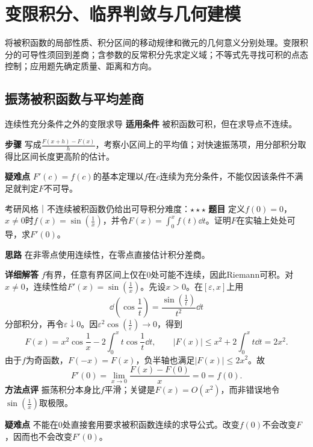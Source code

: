 \section{变限积分、临界判敛与几何建模}\label{ci:integrals}
\begin{examtip}
将被积函数的局部性质、积分区间的移动规律和微元的几何意义分别处理。变限积分的可导性须回到差商；含参数的反常积分先求定义域；不等式先寻找可积的点态控制；应用题先确定质量、距离和方向。
\end{examtip}

\subsection{振荡被积函数与平均差商}\label{ci:oscillatory}
\begin{method}{连续性充分条件之外的变限求导}
\textbf{适用条件} 被积函数可积，但在求导点不连续。\par
\textbf{步骤} 写成$\frac{F(x+h)-F(x)}{h}$，考察小区间上的平均值；对快速振荡项，用分部积分取得比区间长度更高阶的估计。\par
\textbf{疑难点} $F'(c)=f(c)$的基本定理以$f$在$c$连续为充分条件，不能仅因该条件不满足就判定$F$不可导。
\end{method}
\begin{example}{考研风格｜不连续被积函数仍给出可导积分}{难度：$\star\star\star$}\label{ci:ex:oscillatory}
\textbf{题目} 定义$f(0)=0$，$x\ne0$时$f(x)=\sin(\frac{1}{x})$，并令$F(x)=\int_0^x f(t)\dd t$。证明$F$在实轴上处处可导，求$F'(0)$。\par
\textbf{思路} 在非零点使用连续性，在零点直接估计积分差商。\par
\textbf{详细解答} $f$有界，任意有界区间上仅在0处可能不连续，因此Riemann可积。对$x\ne0$，连续性给$F'(x)=\sin(\frac{1}{x})$。先设$x>0$。在$[\varepsilon,x]$上用
\[
 \dd\!\left(\cos\dfrac1t\right)=\dfrac{\sin(\frac{1}{t})}{t^2}\dd t
\]
分部积分，再令$\varepsilon\downarrow0$。因$\varepsilon^2\cos(\frac{1}{\varepsilon})\to0$，得到
\[
 F(x)=x^2\cos\dfrac1x-2\int_0^x t\cos\dfrac1t\dd t,
 \qquad |F(x)|\le x^2+2\int_0^x t\dd t=2x^2.
\]
由于$f$为奇函数，$F(-x)=F(x)$，负半轴也满足$|F(x)|\le2x^2$。故
\[
 F'(0)=\lim_{x\to0}\dfrac{F(x)-F(0)}x=0=f(0).
\]
\textbf{方法点评} 振荡积分本身比$f$平滑；关键是$F(x)=O(x^2)$，而非错误地令$\sin(\frac{1}{x})$取极限。\par
\textbf{疑难点} 不能在0处直接套用要求被积函数连续的求导公式。改变$f(0)$不会改变$F$，因而也不会改变$F'(0)$。
\end{example}

